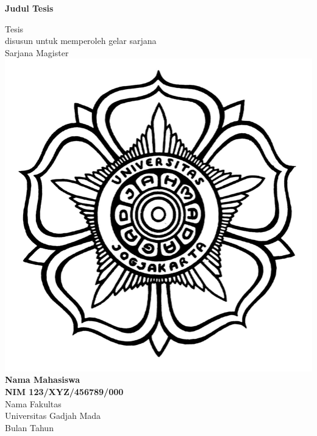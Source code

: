 \documentclass[12pt,hidelinks]{report}
\begin{document}
\begin{titlepage}
   \begin{center}
       \vspace*{1cm}
   \begin{large}
    \textbf{Judul Tesis} \\
 \end{large}
       \vspace{1.5cm}
Tesis\\
       disusun untuk memperoleh gelar sarjana\\
       Sarjana Magister
       \vspace{0.8cm} \\
  \includegraphics[scale=0.50]{logo.jpg}
       \vfill
        \textbf{Nama Mahasiswa}\\
        \textbf{NIM 123/XYZ/456789/000}\\
       \vspace{1.8cm}
       Nama Fakultas \\
       Universitas Gadjah Mada\\
      Bulan Tahun
   \end{center}
\end{titlepage}
\end{document}
